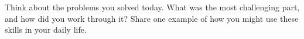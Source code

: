 \documentclass[12pt]{article}
\begin{document}
\vspace{1em}

\begin{tcolorbox}[colframe=black!60, colback=white, 
coltitle=black, colbacktitle=black!15, fonttitle=\bfseries\Large, 
title=Reflection, halign title=center, left=10pt, right=10pt, top=10pt, bottom=100pt]
Think about the problems you solved today. What was the most challenging part, and how did you work through it?  Share one example of how you might use these skills in your daily life.
\end{tcolorbox}
\end{document}
